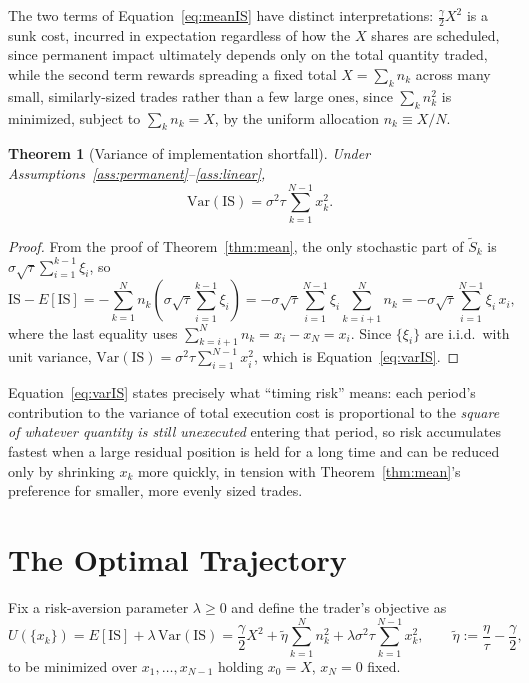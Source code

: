 \documentclass[11pt]{article}
\newtheorem{theorem}{Theorem}
\theoremstyle{remark}
\theoremstyle{definition}
\begin{document}
The two terms of Equation~\eqref{eq:meanIS} have distinct interpretations: $\tfrac{\gamma}{2}X^2$ is a sunk cost, incurred in expectation regardless of how the $X$ shares are scheduled, since permanent impact ultimately depends only on the total quantity traded, while the second term rewards spreading a fixed total $X=\sum_k n_k$ across many small, similarly-sized trades rather than a few large ones, since $\sum_k n_k^2$ is minimized, subject to $\sum_k n_k=X$, by the uniform allocation $n_k\equiv X/N$.

\begin{theorem}[Variance of implementation shortfall]
\label{thm:var}
Under Assumptions~\ref{ass:permanent}--\ref{ass:linear},
\begin{equation}
\mathrm{Var}(\text{IS}) = \sigma^2\tau\sum_{k=1}^{N-1} x_k^2.
\label{eq:varIS}
\end{equation}
\end{theorem}
\begin{proof}
From the proof of Theorem~\ref{thm:mean}, the only stochastic part of $\tilde S_k$ is $\sigma\sqrt\tau\sum_{i=1}^{k-1}\xi_i$, so
\begin{equation*}
\text{IS}-E[\text{IS}] = -\sum_{k=1}^N n_k\!\left(\sigma\sqrt\tau\sum_{i=1}^{k-1}\xi_i\right) = -\sigma\sqrt\tau\sum_{i=1}^{N-1}\xi_i\sum_{k=i+1}^N n_k = -\sigma\sqrt\tau\sum_{i=1}^{N-1}\xi_i\,x_i,
\end{equation*}
where the last equality uses $\sum_{k=i+1}^N n_k = x_i - x_N = x_i$. Since $\{\xi_i\}$ are i.i.d.\ with unit variance, $\mathrm{Var}(\text{IS}) = \sigma^2\tau\sum_{i=1}^{N-1}x_i^2$, which is Equation~\eqref{eq:varIS}.
\end{proof}

Equation~\eqref{eq:varIS} states precisely what ``timing risk'' means: each period's contribution to the variance of total execution cost is proportional to the \emph{square of whatever quantity is still unexecuted} entering that period, so risk accumulates fastest when a large residual position is held for a long time and can be reduced only by shrinking $x_k$ more quickly, in tension with Theorem~\ref{thm:mean}'s preference for smaller, more evenly sized trades.

\section{The Optimal Trajectory}
\label{sec:derivation}

Fix a risk-aversion parameter $\lambda\ge0$ and define the trader's objective as
\begin{equation}
U(\{x_k\}) = E[\text{IS}] + \lambda\,\mathrm{Var}(\text{IS}) = \frac{\gamma}{2}X^2 + \tilde\eta\sum_{k=1}^N n_k^2 + \lambda\sigma^2\tau\sum_{k=1}^{N-1}x_k^2, \qquad \tilde\eta := \frac{\eta}{\tau}-\frac{\gamma}{2},
\label{eq:objective}
\end{equation}
to be minimized over $x_1,\ldots,x_{N-1}$ holding $x_0=X$, $x_N=0$ fixed.
\end{document}
